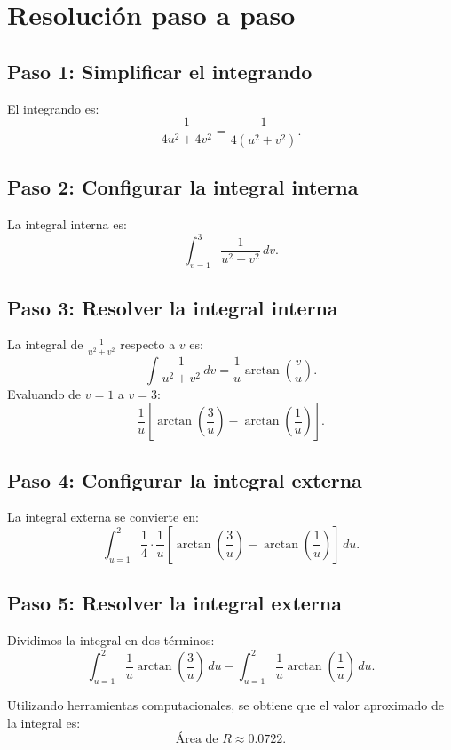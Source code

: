 \section*{Resolución paso a paso}

\subsection*{Paso 1: Simplificar el integrando}

El integrando es:
\[
\frac{1}{4u^2 + 4v^2} = \frac{1}{4(u^2 + v^2)}.
\]

\subsection*{Paso 2: Configurar la integral interna}

La integral interna es:
\[
\int_{v=1}^{3} \frac{1}{u^2 + v^2} \, dv.
\]

\subsection*{Paso 3: Resolver la integral interna}

La integral de \(\frac{1}{u^2 + v^2}\) respecto a \( v \) es:
\[
\int \frac{1}{u^2 + v^2} \, dv = \frac{1}{u} \arctan\left(\frac{v}{u}\right).
\]
Evaluando de \( v=1 \) a \( v=3 \):
\[
\frac{1}{u} \left[\arctan\left(\frac{3}{u}\right) - \arctan\left(\frac{1}{u}\right)\right].
\]

\subsection*{Paso 4: Configurar la integral externa}

La integral externa se convierte en:
\[
\int_{u=1}^{2} \frac{1}{4} \cdot \frac{1}{u} \left[\arctan\left(\frac{3}{u}\right) - \arctan\left(\frac{1}{u}\right)\right] \, du.
\]

\subsection*{Paso 5: Resolver la integral externa}

Dividimos la integral en dos términos:
\[
\int_{u=1}^{2} \frac{1}{u} \arctan\left(\frac{3}{u}\right) \, du - \int_{u=1}^{2} \frac{1}{u} \arctan\left(\frac{1}{u}\right) \, du.
\]

Utilizando herramientas computacionales, se obtiene que el valor aproximado de la integral es:
\[
\text{Área de } R \approx 0.0722.
\]

